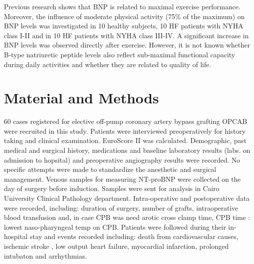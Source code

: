 \documentclass[14pt,a4paper,onecolumn]{extarticle}
\begin{document}
Previous research shows that BNP is related to maximal exercise performance. \citep{Kruger2002} Moreover, the influence of moderate physical activity (75\% of the maximum) on BNP levels was investigated in 10 healthy subjects, 10 HF patients with NYHA class I-II and in 10 HF patients with NYHA class III-IV. A significant increase in BNP levels was observed directly after exercise. \citep{McNairy2002} However, it is not known whether B-type natriuretic peptide levels also reflect sub-maximal functional capacity during daily activities and whether they are related to quality of life.


%


\clearpage
\section{Material and Methods}


60 cases registered for elective off-pump coronary artery bypass grafting OPCAB were recruited in this study. Patients were interviewed preoperatively for history taking and clinical examination. EuroScore II was calculated. Demographic, past medical and surgical history, medications and baseline laboratory results (labs. on admission to hopsital) and preoperative angiography results were recorded.  No specific attempts were made to standardize the anesthetic and surgical management.  Venous samples for measuring NT-proBNP were collected on the day of surgery before induction. Samples were sent for analysis in Cairo University Clinical Pathology department. Intra-operative and postoperative data were recorded, including: duration of surgery, number of grafts, intraoperative blood transfusion and, in case CPB was need arotic cross clamp time, CPB time : lowest naso-pharyngeal temp on CPB.  Patients were followed during their in-hospital stay and events recorded including: death from cardiovascular causes, ischemic stroke , low output heart failure,  myocardial infarction, prolonged intubaton and arrhythmias.
\end{document}
